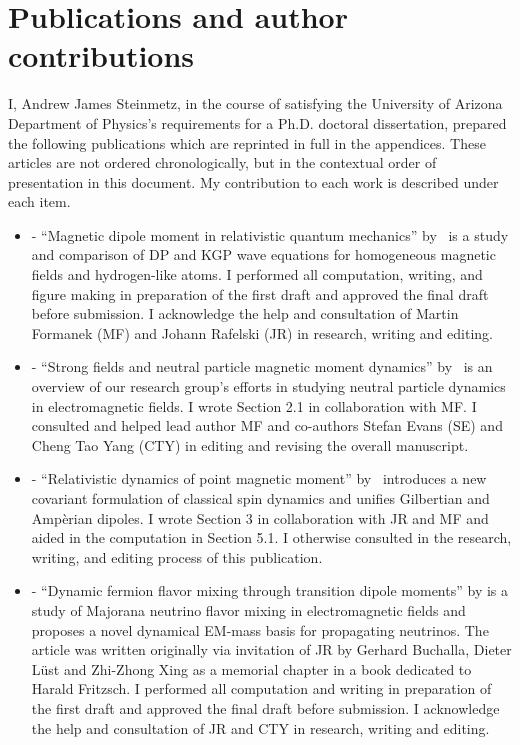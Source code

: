 \chapter*{Publications and author contributions}
\label{sec:pubs}
I, Andrew James Steinmetz\orc{\orcC}, in the course of satisfying the University of Arizona Department of Physics's requirements for a Ph.D. doctoral dissertation, prepared the following publications which are reprinted in full in the appendices. These articles are not ordered chronologically, but in the contextual order of presentation in this document. My contribution to each work is described under each item.
\begin{itemize}
    \item {} - ``Magnetic dipole moment in relativistic quantum mechanics'' by~\citet*{Steinmetz:2018ryf} is a study and comparison of DP and KGP wave equations for homogeneous magnetic fields and hydrogen-like atoms. I performed all computation, writing, and figure making in preparation of the first draft and approved the final draft before submission. I acknowledge the help and consultation of Martin Formanek\orc{\orcD} (MF) and Johann Rafelski\orc{\orcA} (JR) in research, writing and editing.
    \item {} - ``Strong fields and neutral particle magnetic moment dynamics'' by~\citet*{Formanek:2017mbv} is an overview of our research group's efforts in studying neutral particle dynamics in electromagnetic fields. I wrote Section 2.1 in collaboration with MF. I consulted and helped lead author MF and co-authors Stefan Evans\orc{\orcF} (SE) and Cheng Tao Yang\orc{\orcB} (CTY) in editing and revising the overall manuscript.
    \item {} - ``Relativistic dynamics of point magnetic moment'' by~\citet*{Rafelski:2017hce} introduces a new covariant formulation of classical spin dynamics and unifies Gilbertian and Amp{\`e}rian dipoles. I wrote Section 3 in collaboration with JR and MF and aided in the computation in Section 5.1. I otherwise consulted in the research, writing, and editing process of this publication.
    \item {} - ``Dynamic fermion flavor mixing through transition dipole moments'' by \citet*{Rafelski:2023zgp} is a study of Majorana neutrino flavor mixing in electromagnetic fields and proposes a novel dynamical EM-mass basis for propagating neutrinos. The article was written originally via invitation of JR by Gerhard Buchalla, Dieter L\"ust and Zhi-Zhong Xing as a memorial chapter in a book dedicated to Harald Fritzsch. I performed all computation and writing in preparation of the first draft and approved the final draft before submission. I acknowledge the help and consultation of JR and CTY in research, writing and editing.

\end{itemize}
